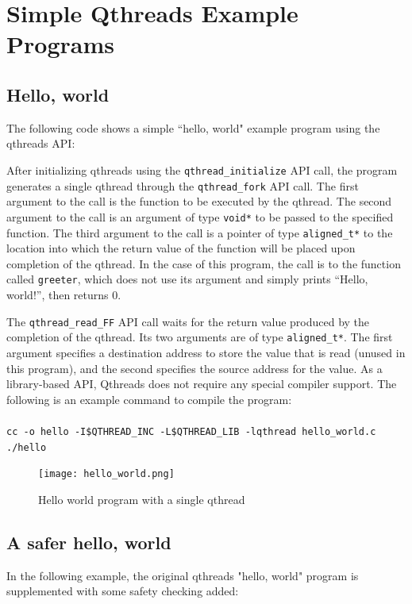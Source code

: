 \documentclass[12pt,fullpage]{article}
\begin{document}
\newpage
\section{Simple Qthreads Example Programs}

\subsection{Hello, world}

The following code shows a simple ``hello, world" example program using the qthreads API:


After initializing qthreads using the {\tt qthread\_initialize} API call, the program generates a single qthread through the {\tt qthread\_fork} API call.  The first argument to the call is the function to be executed by the qthread.  The second argument to the call is an argument of type {\tt void*} to be passed to the specified function.  The third argument to the call is a pointer of type {\tt aligned\_t*} to the location into which the return value of the function will be placed upon completion of the qthread.  In the case of this program, the call is to the function called {\tt greeter}, which does not use its argument and simply prints ``Hello, world!'', then returns 0.  

The {\tt qthread\_read\_FF} API call waits for the return value produced by the completion of the qthread.  Its two arguments are of type {\tt aligned\_t*}.  The first argument specifies a destination address to store the value that is read (unused in this program), and the second specifies the source address for the value.
As a library-based API, Qthreads does not require any special compiler support.  The following is an example command to compile the program:
\\ \\
{\footnotesize{\tt cc -o hello -I\$QTHREAD\_INC -L\$QTHREAD\_LIB -lqthread hello\_world.c}}
\\
{\footnotesize{\tt ./hello}}
\begin{figure}[h]
\texttt{[image: hello\_world.png]}
\caption{Hello world program with a single qthread}
\label{fig:hello_world}
\end{figure}

\subsection{A safer hello, world}

In the following example, the original qthreads "hello, world" program is supplemented with some safety checking added:
\\

\end{document}
